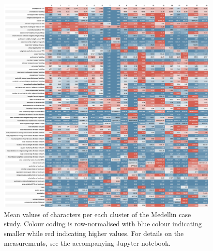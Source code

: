 \begin{figure}
  \includegraphics[width=\linewidth]{figures/medellin_means.png}
  \caption{Mean values of characters per each cluster of the Medellin case study.
  Colour coding is row-normalised with blue colour indicating smaller while red indicating
  higher values. For details on the measurements, see the accompanying Jupyter notebook.
  }
  \label{fig:means_med}
\end{figure}

